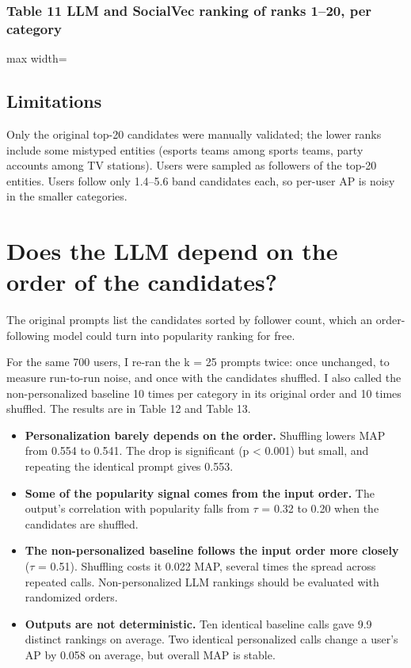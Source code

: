 \documentclass[10pt]{article}
\begin{document}
\subsubsection*{Table 11 \textperiodcentered{} LLM and SocialVec ranking of ranks 1--20, per category}
\begin{center}\begin{adjustbox}{max width=\linewidth}

\end{adjustbox}\end{center}

\subsection*{Limitations}
Only the original top-20 candidates were manually validated; the lower ranks include some mistyped entities (esports teams among sports teams, party accounts among TV stations). Users were sampled as followers of the top-20 entities. Users follow only 1.4--5.6 band candidates each, so per-user AP is noisy in the smaller categories.

\section{Does the LLM depend on the order of the candidates?}
The original prompts list the candidates sorted by follower count, which an order-following model could turn into popularity ranking for free.

For the same 700 users, I re-ran the k = 25 prompts twice: once unchanged, to measure run-to-run noise, and once with the candidates shuffled. I also called the non-personalized baseline 10 times per category in its original order and 10 times shuffled. The results are in Table 12 and Table 13.

\begin{itemize}
  \item \textbf{Personalization barely depends on the order.} Shuffling lowers MAP from 0.554 to 0.541. The drop is significant (p \textless{} 0.001) but small, and repeating the identical prompt gives 0.553.
  \item \textbf{Some of the popularity signal comes from the input order.} The output's correlation with popularity falls from $\tau$ = 0.32 to 0.20 when the candidates are shuffled.
  \item \textbf{The non-personalized baseline follows the input order more closely} ($\tau$ = 0.51). Shuffling costs it 0.022 MAP, several times the spread across repeated calls. Non-personalized LLM rankings should be evaluated with randomized orders.
  \item \textbf{Outputs are not deterministic.} Ten identical baseline calls gave 9.9 distinct rankings on average. Two identical personalized calls change a user's AP by 0.058 on average, but overall MAP is stable.
\end{itemize}
\end{document}
